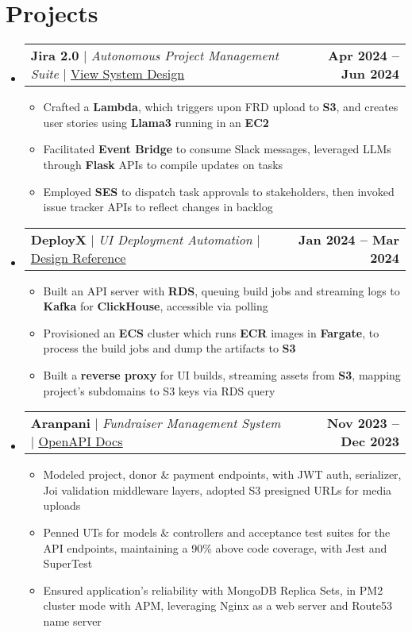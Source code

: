 \documentclass[letterpaper,11pt]{article}
\makeatletter
\newcommand{\resumeItem}[1]{
  \item\small{
    {#1 \vspace{-2pt}}
  }
}
\newcommand{\resumeProjectHeading}[2]{
    \item
    \begin{tabular*}{1.001\textwidth}{l@{\extracolsep{\fill}}r}
      \small#1 & \textbf{\small #2}\\
    \end{tabular*}\vspace{-7pt}
}
\newcommand{\resumeSubHeadingListStart}{\begin{itemize}[leftmargin=0.0in, label={}]}
\newcommand{\resumeSubHeadingListEnd}{\end{itemize}}
\newcommand{\resumeItemListStart}{\begin{itemize}}
\newcommand{\resumeItemListEnd}{\end{itemize}\vspace{-5pt}}
\makeatother
\begin{document}
\section{Projects}
    \vspace{-5pt}
    \resumeSubHeadingListStart
      \resumeProjectHeading
          {\textbf{Jira 2.0} $|$ \textit{Autonomous Project Management Suite} $|$ \href{https://gist.github.com/kr-aashish/5d1b184bb082b29c0534861d07c2f25a}{\underline{View System Design}}}{Apr 2024 -- Jun 2024}
          \resumeItemListStart
            \resumeItem{Crafted a \textbf{Lambda}, which triggers upon FRD upload to \textbf{S3}, and creates user stories using \textbf{Llama3} running in an \textbf{EC2}}
            \resumeItem{Facilitated \textbf{Event Bridge} to consume Slack messages, leveraged LLMs through \textbf{Flask} APIs to compile updates on tasks}
            \resumeItem{Employed \textbf{SES} to dispatch task approvals to stakeholders, then invoked issue tracker APIs to reflect changes in backlog}
          \resumeItemListEnd
          \vspace{-13pt}
      \resumeProjectHeading
          {\textbf{DeployX} $|$ \textit{UI Deployment Automation} $|$ \href{https://vercel.com/blog/behind-the-scenes-of-vercels-infrastructure}{\underline{Design Reference}}}{Jan 2024 -- Mar 2024}
          \resumeItemListStart
            \resumeItem{Built an API server with \textbf{RDS}, queuing build jobs and streaming logs to \textbf{Kafka} for \textbf{ClickHouse}, accessible via polling}
            \resumeItem{Provisioned an \textbf{ECS} cluster which runs \textbf{ECR} images in \textbf{Fargate}, to process the build jobs and dump the artifacts to \textbf{S3}}
            \resumeItem{Built a \textbf{reverse proxy} for UI builds, streaming assets from \textbf{S3}, mapping project's subdomains to S3 keys via RDS query}
          \resumeItemListEnd
          \vspace{-13pt}
      \resumeProjectHeading
          {\textbf{Aranpani} $|$ \textit{Fundraiser Management System} $|$ \href{https://kr-aashish.github.io/aranpani-api-docs}{\underline{OpenAPI Docs}}}{Nov 2023 -- Dec 2023}
          \resumeItemListStart
            \resumeItem{Modeled project, donor \& payment endpoints, with JWT auth, serializer, Joi validation middleware layers, adopted S3 pre\textendash signed URLs for media uploads}
            \resumeItem{Penned UTs for models \& controllers and acceptance test suites for the API endpoints, maintaining a 90\% above code coverage, with Jest and SuperTest}
            \resumeItem{Ensured application's reliability with MongoDB Replica Sets, in PM2 cluster mode with APM, leveraging Nginx as a web server and Route53 name server}
          \resumeItemListEnd
    \resumeSubHeadingListEnd
\vspace{-15pt}
\end{document}
